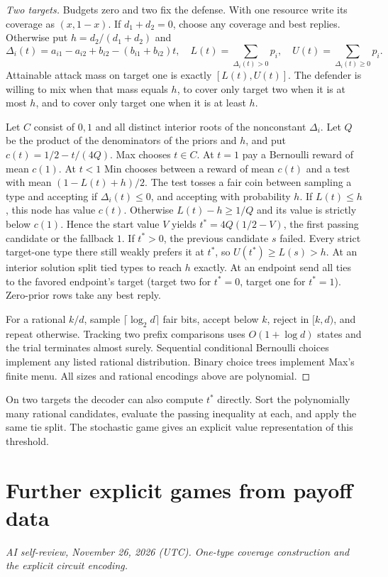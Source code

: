 \documentclass[11pt,oneside,openany,notitlepage]{report}
\newcommand{\reviewdate}{November 26, 2026 (UTC)}
\newcommand{\reviewmark}[1]{\par\nopagebreak[4]\noindent
  {\footnotesize\itshape AI self-review, \reviewdate. #1\par}\nobreak\smallskip}
\begin{document}
\begin{proof}[Two targets]
Budgets zero and two fix the defense. With one resource write its coverage
as \((x,1-x)\). If \(d_1+d_2=0\), choose any coverage and best replies.
Otherwise put \(h=d_2/(d_1+d_2)\) and
\[
  \Delta_i(t)=a_{i1}-a_{i2}+b_{i2}-(b_{i1}+b_{i2})t,\quad
  L(t)=\sum_{\Delta_i(t)>0}p_i,\quad U(t)=\sum_{\Delta_i(t)\ge0}p_i .
\]
Attainable attack mass on target one is exactly \([L(t),U(t)]\).
The defender is willing to mix when that mass equals \(h\), to cover
only target two when it is at most \(h\), and to cover only target one
when it is at least \(h\).

Let \(C\) consist of \(0,1\) and all distinct interior roots of the
nonconstant \(\Delta_i\). Let \(Q\) be the product of the denominators of
the priors and \(h\), and put \(c(t)=1/2-t/(4Q)\). Max chooses \(t\in C\).
At \(t=1\) pay a Bernoulli reward of mean \(c(1)\). At \(t<1\) Min chooses
between a reward of mean \(c(t)\) and a test with mean
\((1-L(t)+h)/2\). The test tosses a fair coin between sampling a type and
accepting if \(\Delta_i(t)\le0\), and accepting with probability \(h\).
If \(L(t)\le h\), this node has value \(c(t)\). Otherwise \(L(t)-h\ge1/Q\)
and its value is strictly below \(c(1)\). Hence the start value \(V\) yields
\(t^*=4Q(1/2-V)\), the first passing candidate or the fallback \(1\).
If \(t^*>0\), the previous candidate \(s\) failed. Every strict target-one
type there still weakly prefers it at \(t^*\), so \(U(t^*)\ge L(s)>h\).
At an interior solution split tied types to reach \(h\) exactly. At an
endpoint send all ties to the favored endpoint's target (target two for
\(t^*=0\), target one for \(t^*=1\)). Zero-prior rows take any best reply.

For a rational \(k/d\), sample \(\lceil\log_2d\rceil\) fair bits, accept
below \(k\), reject in \([k,d)\), and repeat otherwise. Tracking two prefix
comparisons uses \(O(1+\log d)\) states and the trial terminates almost
surely. Sequential conditional Bernoulli choices implement any listed
rational distribution. Binary choice trees implement Max's finite menu.
All sizes and rational encodings above are polynomial.
\end{proof}
On two targets the decoder can also compute \(t^*\) directly. Sort
the polynomially many rational candidates, evaluate the passing
inequality at each, and apply the same tie split. The stochastic
game gives an explicit value representation of this threshold.

\section{Further explicit games from payoff data}
\reviewmark{One-type coverage construction and the explicit circuit encoding.}
\end{document}
